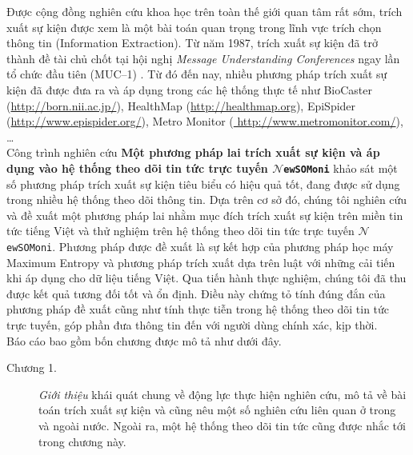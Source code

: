 %
\clearpage
\pagestyle{empty}
%
\begin{preface}
	\bigskip
    \noindent Được cộng đồng nghiên cứu khoa học trên toàn thế giới quan tâm rất
    sớm, trích xuất sự kiện được xem là một bài toán quan trọng trong lĩnh vực
    trích chọn thông tin (Information Extraction). Từ năm 1987, trích xuất sự
    kiện đã trở thành đề tài chủ chốt tại hội nghị \emph{Message Understanding
    Conferences} ngay lần tổ
	chức đầu tiên (MUC--1) \cite{RB96}. Từ đó đến nay, nhiều phương pháp trích
    xuất sự kiện đã được đưa ra  và áp dụng trong các hệ thống thực tế như
    BioCaster (\href{http://born.nii.ac.jp/}{http://born.nii.ac.jp/}), HealthMap
    (\href{http://healthmap.org}{http://healthmap.org}), EpiSpider\\
    (\href{http://www.epispider.org/}{http://www.epispider.org/}), Metro
    Monitor (\href{ http://www.metromonitor.com/}{
    http://www.metromonitor.com/}), \ldots \\
   \noindent Công trình nghiên cứu \textbf{Một phương pháp lai trích xuất sự kiện và áp
   dụng vào hệ thống theo dõi tin tức trực tuyến  $\mathcal{N}$\texttt{ewSOMoni}} khảo sát một số phương pháp trích xuất sự
    kiện tiêu biểu có hiệu quả tốt, đang được sử dụng trong nhiều hệ thống
    theo dõi thông tin. Dựa trên cơ sở đó, chúng tôi  nghiên cứu và đề xuất một phương
    pháp lai nhằm mục đích trích xuất sự kiện trên miền tin tức tiếng Việt và
    thử nghiệm trên hệ thống theo dõi tin tức trực tuyến
    $\mathcal{N}$\texttt{ewSOMoni}. Phương pháp được đề xuất là sự kết hợp của
    phương pháp học máy Maximum Entropy và phương pháp trích xuất dựa trên
    luật với những cải tiến khi áp dụng cho dữ liệu tiếng Việt. Qua tiến hành
    thực nghiệm, chúng tôi đã thu được kết quả tương đối tốt và ổn định. Điều
    này chứng tỏ tính đúng đắn của phương pháp đề xuất cũng như tính thực tiễn
    trong hệ thống theo dõi tin tức trực tuyến, góp phần đưa thông tin đến với
    người dùng chính xác, kịp thời.
    \\[0.5cm]
	\noindent Báo cáo bao gồm bốn chương được mô tả như dưới đây.

	\begin{description}
		\item[Chương 1.] \emph{Giới thiệu} khái quát chung về động lực thực hiện
		nghiên cứu, mô tả về bài toán trích xuất sự kiện và cũng nêu một số
		nghiên cứu liên quan ở trong và ngoài nước. Ngoài ra, một hệ thống theo
		dõi tin tức cũng được nhắc tới trong chương này.



\end{description}
\end{preface}
